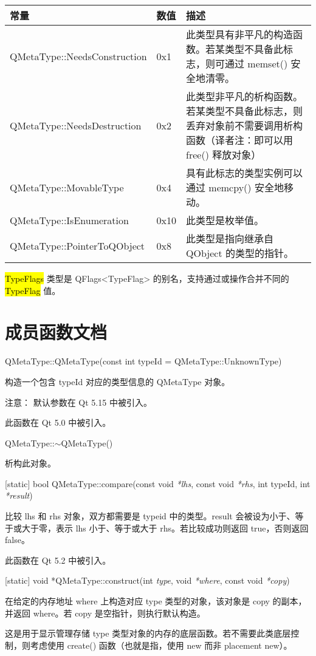 \begin{tabular}{|l|l|l|}
\hline
常量 	&数值 &	描述\\
\hline
QMetaType::NeedsConstruction &	0x1 &	此类型具有非平凡的构造函数。若某类型不具备此标志，则可通过 memset() 安全地清零。\\
\hline
QMetaType::NeedsDestruction &	0x2 	&此类型非平凡的析构函数。若某类型不具备此标志，则丢弃对象前不需要调用析构函数（译者注：即可以用 free() 释放对象）\\
\hline
QMetaType::MovableType &	0x4 &	具有此标志的类型实例可以通过 memcpy() 安全地移动。\\
\hline
QMetaType::IsEnumeration 	&0x10 &	此类型是枚举值。\\
\hline
QMetaType::PointerToQObject &	0x8 &	此类型是指向继承自 QObject 的类型的指针。\\
\hline
\end{tabular}

\hl{TypeFlags} 类型是 QFlags<TypeFlag> 的别名，支持通过或操作合并不同的 \hl{TypeFlag} 值。

\section{成员函数文档}

QMetaType::QMetaType(const int typeId = QMetaType::UnknownType)

构造一个包含 typeId 对应的类型信息的 QMetaType 对象。

注意： 默认参数在 Qt 5.15 中被引入。

此函数在 Qt 5.0 中被引入。

QMetaType::$\sim$QMetaType()

析构此对象。

[static] bool QMetaType::compare(const void \emph{*lhs}, const void \emph{*rhs}, int typeId, int \emph{*result})

比较 lhs 和 rhs 对象，双方都需要是 typeid 中的类型。result 会被设为小于、等于或大于零，表示 lhs 小于、等于或大于 rhs。若比较成功则返回 true，否则返回 false。

此函数在 Qt 5.2 中被引入。

[static] void *QMetaType::construct(int \emph{type}, void \emph{*where}, const void \emph{*copy})

在给定的内存地址 where 上构造对应 type 类型的对象，该对象是 copy 的副本，并返回 where。若 copy 是空指针，则执行默认构造。

这是用于显示管理存储 type 类型对象的内存的底层函数。若不需要此类底层控制，则考虑使用 create() 函数（也就是指，使用 new 而非 placement new）。

